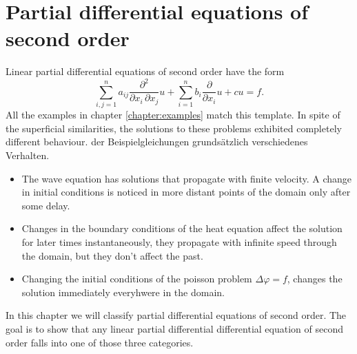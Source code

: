 %
%
%
\chapter{Partial differential equations of second order\label{chapter-2ordnung}}
Linear partial differential equations of second order have the form
\begin{equation}
\sum_{i,j=1}^na_{ij}\frac{\partial^2}{\partial x_i\,\partial x_j} u
+
\sum_{i=1}^nb_i\frac{\partial}{\partial x_i} u+cu=f.
\label{operator2ordnung}
\end{equation}
All the examples in chapter
\ref{chapter:examples}
match this template.
In spite of the superficial similarities, the solutions to these problems
exhibited completely different behaviour.
der Beispielgleichungen grundsätzlich verschiedenes Verhalten.
\begin{itemize}
\item The wave equation has solutions that propagate with finite 
velocity.
A change in initial conditions is noticed in more distant points of
the domain only after some delay.
\item
Changes in the boundary conditions of the heat equation affect the solution
for later times instantaneously, they propagate with infinite speed through
the domain, but they don't affect the past.
\item
Changing the initial conditions of the poisson problem
$\Delta \varphi=f$,
changes the solution immediately everyhwere in the domain.
\end{itemize}
In this chapter we will classify partial differential equations of
second order.
The goal is to show that any linear partial differential differential
equation of second order falls into one of those three categories.






